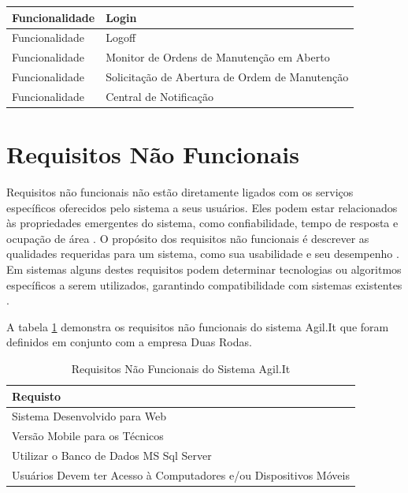 \begin{table}[H]
\begin{tabular}{l|l}
		Funcionalidade             & Login                                          \\ \hline
		Funcionalidade             & Logoff                                         \\ \hline
		Funcionalidade             & Monitor de Ordens de Manutenção em Aberto      \\ \hline
		Funcionalidade             & Solicitação de Abertura de Ordem de Manutenção \\ \hline
		Funcionalidade             & Central de Notificação                         \\ \hline
	\end{tabular}
\end{table}

\section{Requisitos Não Funcionais}

Requisitos não funcionais não estão diretamente ligados com os serviços específicos oferecidos pelo sistema a seus usuários. Eles podem estar relacionados às propriedades emergentes do sistema, como confiabilidade, tempo de resposta e ocupação de área \cite{sommerville2011software}. O propósito dos requisitos não funcionais é descrever as qualidades requeridas para um sistema, como sua usabilidade e seu desempenho \cite{IIBA2005}. Em sistemas alguns destes requisitos podem determinar tecnologias ou algoritmos específicos a serem utilizados, garantindo compatibilidade com sistemas existentes \cite{cordeiro2007}.

A tabela \ref{tabela-requsitos-nao-funcionais} demonstra os requisitos não funcionais do sistema Agil.It que foram definidos em conjunto com a empresa Duas Rodas.

\begin{table}[H]
	\centering
	\caption{\label{tabela-requsitos-nao-funcionais}Requisitos Não Funcionais do Sistema Agil.It}
	\begin{tabular}{l}
		\hline
		\multicolumn{1}{l}{\textbf{Requisto}}                                                 \\ \hline
		\multicolumn{1}{l}{Sistema Desenvolvido para Web}                                     \\ \hline
		\multicolumn{1}{l}{Versão Mobile para os Técnicos}                                    \\ \hline
		\multicolumn{1}{l}{Utilizar o Banco de Dados MS Sql Server}                           \\ \hline
		\multicolumn{1}{l}{Usuários Devem ter Acesso à Computadores e/ou Dispositivos Móveis} \\ \hline
	\end{tabular}
\end{table}

